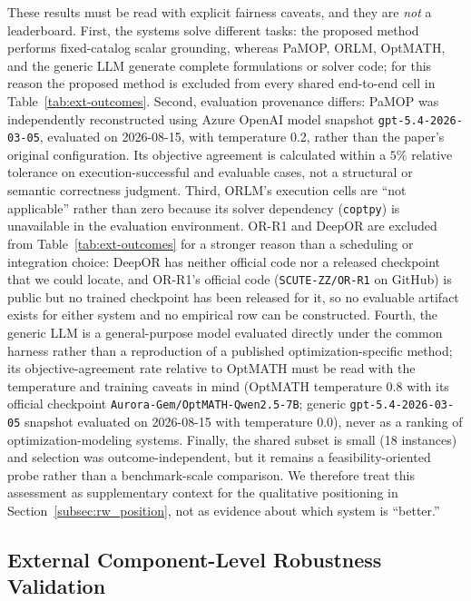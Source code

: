 \documentclass[pdflatex,sn-basic,Numbered]{sn-jnl}
\begin{document}
These results must be read with explicit fairness caveats, and they are \emph{not} a leaderboard. First, the systems solve different tasks: the proposed method performs fixed-catalog scalar grounding, whereas PaMOP, ORLM, OptMATH, and the generic LLM generate complete formulations or solver code; for this reason the proposed method is excluded from every shared end-to-end cell in Table~\ref{tab:ext-outcomes}. Second, evaluation provenance differs: PaMOP was independently reconstructed using Azure OpenAI model snapshot \texttt{gpt-5.4-2026-03-05}, evaluated on 2026-08-15, with temperature 0.2, rather than the paper's original configuration. Its objective agreement is calculated within a $5\%$ relative tolerance on execution-successful and evaluable cases, not a structural or semantic correctness judgment. Third, ORLM's execution cells are ``not applicable'' rather than zero because its solver dependency (\texttt{coptpy}) is unavailable in the evaluation environment. OR-R1 and DeepOR are excluded from Table~\ref{tab:ext-outcomes} for a stronger reason than a scheduling or integration choice: DeepOR has neither official code nor a released checkpoint that we could locate, and OR-R1's official code (\texttt{SCUTE-ZZ/OR-R1} on GitHub) is public but no trained checkpoint has been released for it, so no evaluable artifact exists for either system and no empirical row can be constructed. Fourth, the generic LLM is a general-purpose model evaluated directly under the common harness rather than a reproduction of a published optimization-specific method; its objective-agreement rate relative to OptMATH must be read with the temperature and training caveats in mind (OptMATH temperature 0.8 with its official checkpoint \texttt{Aurora-Gem/OptMATH-Qwen2.5-7B}; generic \texttt{gpt-5.4-2026-03-05} snapshot evaluated on 2026-08-15 with temperature 0.0), never as a ranking of optimization-modeling systems. Finally, the shared subset is small (18 instances) and selection was outcome-independent, but it remains a feasibility-oriented probe rather than a benchmark-scale comparison. We therefore treat this assessment as supplementary context for the qualitative positioning in Section~\ref{subsec:rw_position}, not as evidence about which system is ``better.''

\subsection{External Component-Level Robustness Validation}
\label{subsec:exp_external_validation}
\end{document}
